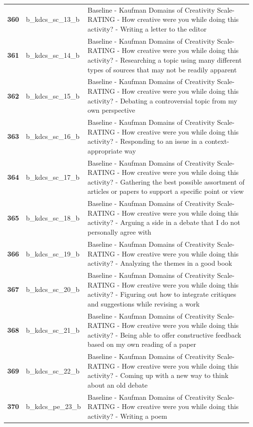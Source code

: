 \documentclass[
  letterpaper,
  DIV=11,
  numbers=noendperiod]{scrartcl}
\begin{document}
\begin{longtable}[t]{>{}cll}
\textbf{360} & b\_kdcs\_sc\_13\_b & Baseline - Kaufman Domains of Creativity Scale-RATING - How creative were you while doing this activity? - Writing a letter to the editor\\
\addlinespace
\textbf{361} & b\_kdcs\_sc\_14\_b & Baseline - Kaufman Domains of Creativity Scale-RATING - How creative were you while doing this activity? - Researching a topic using many different types of sources that may not be readily apparent\\
\textbf{362} & b\_kdcs\_sc\_15\_b & Baseline - Kaufman Domains of Creativity Scale-RATING - How creative were you while doing this activity? - Debating a controversial topic from my own perspective\\
\textbf{363} & b\_kdcs\_sc\_16\_b & Baseline - Kaufman Domains of Creativity Scale-RATING - How creative were you while doing this activity? - Responding to an issue in a context-appropriate way\\
\textbf{364} & b\_kdcs\_sc\_17\_b & Baseline - Kaufman Domains of Creativity Scale-RATING - How creative were you while doing this activity? - Gathering the best possible assortment of articles or papers to support a specific point or view\\
\textbf{365} & b\_kdcs\_sc\_18\_b & Baseline - Kaufman Domains of Creativity Scale-RATING - How creative were you while doing this activity? - Arguing a side in a debate that I do not personally agree with\\
\addlinespace
\textbf{366} & b\_kdcs\_sc\_19\_b & Baseline - Kaufman Domains of Creativity Scale-RATING - How creative were you while doing this activity? - Analyzing the themes in a good book\\
\textbf{367} & b\_kdcs\_sc\_20\_b & Baseline - Kaufman Domains of Creativity Scale-RATING - How creative were you while doing this activity? - Figuring out how to integrate critiques and suggestions while revising a work\\
\textbf{368} & b\_kdcs\_sc\_21\_b & Baseline - Kaufman Domains of Creativity Scale-RATING - How creative were you while doing this activity? - Being able to offer constructive feedback based on my own reading of a paper\\
\textbf{369} & b\_kdcs\_sc\_22\_b & Baseline - Kaufman Domains of Creativity Scale-RATING - How creative were you while doing this activity? - Coming up with a new way to think about an old debate\\
\textbf{370} & b\_kdcs\_pe\_23\_b & Baseline - Kaufman Domains of Creativity Scale-RATING - How creative were you while doing this activity? - Writing a poem\\

\end{longtable}
\end{document}
